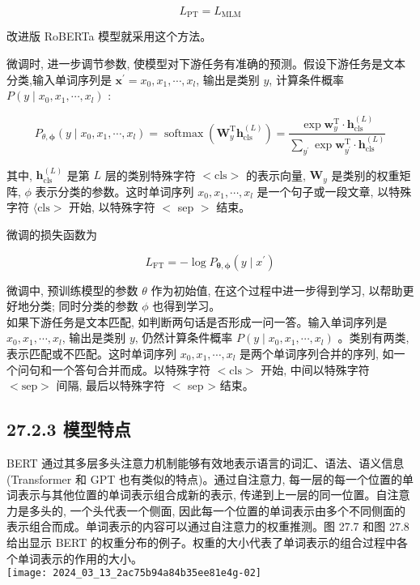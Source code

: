 \documentclass[10pt]{article}
\begin{document}
$$
L_{\mathrm{PT}}=L_{\mathrm{MLM}}
$$

改进版 RoBERTa 模型就采用这个方法。

微调时, 进一步调节参数, 使模型对下游任务有准确的预测。假设下游任务是文本分类,输入单词序列是 $\boldsymbol{x}^{\prime}=x_{0}, x_{1}, \cdots, x_{l}$, 输出是类别 $y$, 计算条件概率 $P\left(y \mid x_{0}, x_{1}, \cdots, x_{l}\right)$ :


\begin{equation*}
P_{\theta, \boldsymbol{\phi}}\left(y \mid x_{0}, x_{1}, \cdots, x_{l}\right)=\operatorname{softmax}\left(\boldsymbol{W}_{y}^{\mathrm{T}} \boldsymbol{h}_{\mathrm{cls}}^{(L)}\right)=\frac{\exp \boldsymbol{w}_{y}^{\mathrm{T}} \cdot \boldsymbol{h}_{\mathrm{cls}}^{(L)}}{\sum_{y^{\prime}} \exp \boldsymbol{w}_{y^{\prime}}^{\mathrm{T}} \cdot \boldsymbol{h}_{\mathrm{cls}}^{(L)}} \tag{27.30}
\end{equation*}


其中, $\boldsymbol{h}_{\mathrm{cls}}^{(L)}$ 是第 $L$ 层的类别特殊字符 $<\mathrm{cls}>$ 的表示向量, $\boldsymbol{W}_{y}$ 是类别的权重矩阵, $\phi$ 表示分类的参数。这时单词序列 $x_{0}, x_{1}, \cdots, x_{l}$ 是一个句子或一段文章, 以特殊字符 $\langle\mathrm{cls}>$ 开始, 以特殊字符 $<$ sep $>$ 结束。

微调的损失函数为


\begin{equation*}
L_{\mathrm{FT}}=-\log P_{\boldsymbol{\theta}, \boldsymbol{\phi}}\left(y \mid x^{\prime}\right) \tag{27.31}
\end{equation*}


微调中, 预训练模型的参数 $\theta$ 作为初始值, 在这个过程中进一步得到学习, 以帮助更好地分类; 同时分类的参数 $\phi$ 也得到学习。\\
如果下游任务是文本匹配, 如判断两句话是否形成一问一答。输入单词序列是 $x_{0}, x_{1}, \cdots, x_{l}$, 输出是类别 $y$, 仍然计算条件概率 $P\left(y \mid x_{0}, x_{1}, \cdots, x_{l}\right)$ 。类别有两类, 表示匹配或不匹配。这时单词序列 $x_{0}, x_{1}, \cdots, x_{l}$ 是两个单词序列合并的序列, 如一个问句和一个答句合并而成。以特殊字符 $<\mathrm{cls}>$ 开始, 中间以特殊字符 $<\mathrm{sep}>$ 间隔, 最后以特殊字符 $<$ sep > 结束。

\subsection*{27.2.3 模型特点}
BERT 通过其多层多头注意力机制能够有效地表示语言的词汇、语法、语义信息 (Transformer 和 GPT 也有类似的特点)。通过自注意力, 每一层的每一个位置的单词表示与其他位置的单词表示组合成新的表示, 传递到上一层的同一位置。自注意力是多头的, 一个头代表一个侧面, 因此每一个位置的单词表示由多个不同侧面的表示组合而成。单词表示的内容可以通过自注意力的权重推测。图 27.7 和图 27.8 给出显示 BERT 的权重分布的例子。权重的大小代表了单词表示的组合过程中各个单词表示的作用的大小。\\
\texttt{[image: 2024\_03\_13\_2ac75b94a84b35ee81e4g-02]}
\end{document}
